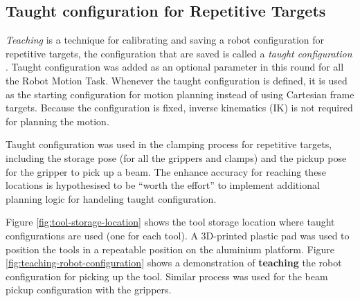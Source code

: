 \subsection{Taught configuration for Repetitive Targets}
\label{subsection:exploration-3-taught-configuration-for-repetitive-targets}

\textit{Teaching} is a technique for calibrating and saving a robot configuration for repetitive targets, the configuration that are saved is called a \textit{taught configuration} .
Taught configuration was added as an optional parameter in this round for all the Robot Motion Task. Whenever the taught configuration is defined, it is used as the starting configuration for motion planning instead of using Cartesian frame targets. Because the configuration is fixed, inverse kinematics (IK) is not required for planning the motion.

Taught configuration was used in the clamping process for repetitive targets, including the storage pose (for all the grippers and clamps) and the pickup pose for the gripper to pick up a beam. The enhance accuracy for reaching these locations is hypothesised to be ``worth the effort'' to implement additional planning logic for handeling taught configuration. 

Figure \ref{fig:tool-storage-location} shows the tool storage location where taught configurations are used (one for each tool). A 3D-printed plastic pad was used to position the tools in a repeatable position on the aluminium platform. Figure \ref{fig:teaching-robot-configuration} shows a demonstration of \textbf{teaching} the robot configuration for picking up the tool. Similar process was used for the beam pickup configuration with the grippers.

